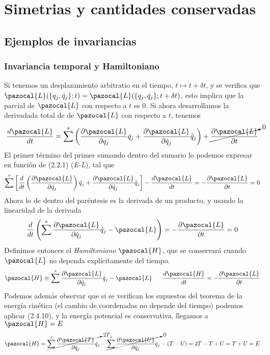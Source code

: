 \chapter{Simetrias y cantidades conservadas}

\section{Ejemplos de invariancias} 
\subsection{Invariancia temporal y Hamiltoniano}
Si tenemos un desplazamiento arbitratio en el tiempo, $t\mapsto t + \delta t$, y se verifica que $\pazocal{L}(\{q_j,\dot{q}_j\};t)=\pazocal{L}(\{q_j,\dot{q}_j\};t+\delta t)$, esto implica que la parcial de $\pazocal{L}$ con respecto a $t$ es 0. Si ahora desarrollamos la derivadada total de de $\pazocal{L}$ con respecto a $t$, tenemos
\vspace{-13pt}
\[\frac{d \pazocal{L}}{dt}=\sum^s\left(\frac{\partial \pazocal{L}}{\partial q_j}\dot{q}_j+\frac{\partial \pazocal{L}}{\partial \dot{q}_j}\ddot{q}_j\right)+\cancelto{0}{\frac{\partial \pazocal{L}}{\partial t}}\]
El primer término del primer sumando dentro del sumario lo podemos expresar en función de (2.2.1)  (\textit{E-L}), tal que
\[\sum^s\left[\frac{d}{dt}\left(\frac{\partial \pazocal{L}}{\partial \dot{q}_j}\right)\dot{q}_j+\frac{\partial \pazocal{L}}{\partial \dot{q}_j}\ddot{q}_j\right]-\frac{d \pazocal{L}}{dt} = -\frac{\partial \pazocal{L}}{\partial t} =0\]
Ahora lo de dentro del paréntesis es la derivada de un producto, y usando la linearidad de la derivada
\begin{equation} \label{3.1.1}
    \frac{d}{dt}\left(\sum^s \frac{\partial \pazocal{L}}{\partial \dot{q}_j}\dot{q}_j-\pazocal{L}\right) = -\frac{\partial \pazocal{L}}{\partial t} =0
\end{equation} 
Definimos entonces el \textit{Hamiltoniano} $\pazocal{H}$, que se conservará cuando $\pazocal{L}$ no dependa explícitamente del tiempo.
\begin{equation} \label{3.1.2}
    \pazocal{H} \equiv \sum^s \frac{\partial \pazocal{L}}{\partial \dot{q}_j}\dot{q}_j-\pazocal{L} \ \ \ \ \ \frac{d \pazocal{H}}{dt}=-\frac{\partial \pazocal{L}}{\partial t}
\end{equation}  
Podemos además observar que si se verifican los supuestos del teorema de la energía cinética (el cambio de coordenadas no depende del tiempo) podemos aplicar (2.4.10), y la energía potencial es conservativa, llegamos a $\pazocal{H}=E$
\vspace{-10pt}
\begin{equation} \label{3.1.3}
    \pazocal{H} = \cancelto{2T}{\sum^s\frac{\partial \pazocal{T}}{\partial \dot{q}_j}\dot{q}_j}-\cancelto{0}{\sum^s\frac{\partial \pazocal{U}}{\partial \dot{q}_j}\dot{q}_j}-(T-U)= 2T -T + U = T+U =E 
\end{equation} 

